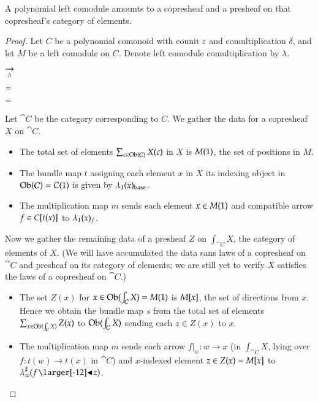 \documentclass{amsart}
\begin{document}
\begin{prop}
  A polynomial left comodule amounts to a copresheaf and a presheaf on that
  copresheaf's category of elements.
\end{prop}
\begin{proof}
  Let $C$ be a polynomial comonoid with counit $\varepsilon$ and
  comultiplication $\delta$, and let $M$ be a left comodule on
  $C$. Denote left comodule comultiplication by $\lambda$.

  \begin{center}
    
    \hspace{-.75em}
    $\underset{\lambda}{\to}$
    \hspace{.5em}
    
  \end{center}

  \begin{center}
    
    \quad
    $=$
    
  \end{center}
  
  \begin{center}
    
    \quad
    $=$
    \quad
    
  \end{center}

  Let $\cat{C}$ be the category corresponding to $C$. We gather the
  data for a copresheaf $X$ on $\cat{C}$.
  \begin{itemize}
  \item The total set of elements $\sum_{c \in \operatorname{Ob}(\mathcal{C})}X(c)$ in
    $X$ is $M(1)$, the set of positions in $M$.
  \item The bundle map $t$ assigning each element $x$ in $X$ its indexing
    object in $\operatorname{Ob}(\mathcal{C}) = C(1)$ is given by ${\lambda}_1(x)_{\mathrm{base}}$.
  \item The multiplication map $m$ sends each element $x \in M(1)$
    and compatible arrow $f \in C[t(x)]$ to
    ${\lambda}_1(x)_f$.
  \end{itemize}

  Now we gather the remaining data of a presheaf $Z$ on
  $\int_{\cat{C}}X$, the category of elements of $X$. (We will have
  accumulated the data sans laws of a copresheaf on $\cat{C}$ and
  presheaf on its category of elements; we are still yet to
  verify $X$ satisfies the laws of a copresheaf on $\cat{C}$.)
  \begin{itemize}
  \item The set $Z(x)$ for $x \in \operatorname{Ob}(\int_{\mathcal{C}}X) = M(1)$ is
    $M[x]$, the set of directions from $x$. Hence we obtain the
    bundle map $s$ from the total set of elements
    $\sum_{x \in \operatorname{Ob}(\int_{\mathcal{C}}X)}Z(x)$ to $\operatorname{Ob}(\int_{\mathcal{C}}X)$
    sending each $z \in Z(x)$ to $x$.
  \item The multiplication map $m$ sends each arrow $f|_w: w \to x$
    (in $\int_{\cat{C}}X$, lying over $f: t(w) \to t(x)$ in $\cat{C}$)
    and $x$-indexed element $z \in Z(x) = M[x]$ to
    $\dirmapof{\lambda}{w}{f \subd z}$.


\end{itemize}
\end{proof}
\end{document}
